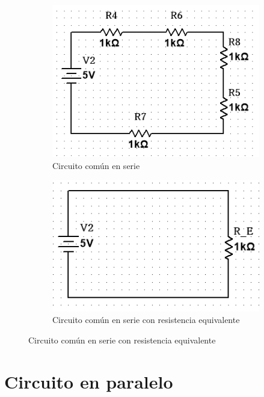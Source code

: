 \documentclass[a4paper,11pt]{article}
\begin{document}
\begin{figure}[H]
    \centering
    \begin{subfigure}{0.4\textwidth}
        \includegraphics[width=0.9\linewidth]{images/serie.PNG}
        \caption{Circuito común en serie}
        \label{fig:cs2}
    \end{subfigure}
    \begin{subfigure}{0.4\textwidth}
        \includegraphics[width=0.9\linewidth]{images/equivalente.PNG}
        \caption{Circuito común en serie con resistencia equivalente}
        \label{fig:cs2E}
    \end{subfigure}
\end{figure}


\section{Circuito en paralelo}
\end{document}
